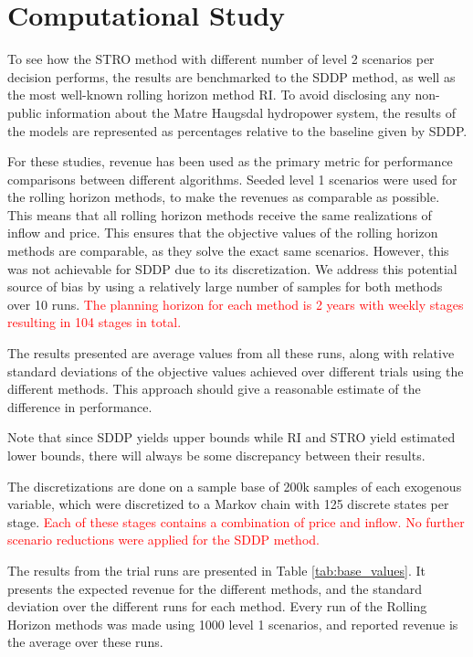 \section{Computational Study}
\label{section:comp_study}

To see how the STRO method with different number of level 2 scenarios per decision performs, the results are benchmarked to the SDDP method, as well as the most well-known rolling horizon method RI. To avoid disclosing any non-public information about the Matre Haugsdal hydropower system, the results of the models are represented as percentages relative to the baseline given by SDDP. 


For these studies, revenue has been used as the primary metric for performance comparisons between different algorithms. Seeded level 1 scenarios were used for the rolling horizon methods, to make the revenues as comparable as possible. This means that all rolling horizon methods receive the same realizations of inflow and price. This ensures that the objective values of the rolling horizon methods are comparable, as they solve the exact same scenarios. However, this was not achievable for SDDP due to its discretization. We address this potential source of bias by using a relatively large number of samples for both methods over 10 runs. \textcolor{red}{The planning horizon for each method is 2 years with weekly stages resulting in 104 stages in total.} 

The results presented are average values from all these runs, along with relative standard deviations of the objective values achieved over different trials using the different methods. This approach should give a reasonable estimate of the difference in performance. 

Note that since SDDP yields upper bounds while RI and STRO yield estimated lower bounds, there will always be some discrepancy between their results. 


The discretizations are done on a sample base of 200k samples of each exogenous variable, which were discretized to a Markov chain with 125 discrete states per stage. \textcolor{red}{Each of these stages contains a combination of price and inflow. No further scenario reductions were applied for the SDDP method.}  



The results from the trial runs are presented in Table \ref{tab:base_values}. It presents the expected revenue for the different methods, and the standard deviation over the different runs for each method. Every run of the Rolling Horizon methods was made using 1000 level 1 scenarios, and reported revenue is the average over these runs. 
 

